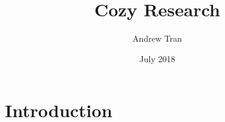 \documentclass[12pt]{article}
\title{Cozy Research}
\author{Andrew Tran}
\date{July 2018}
\begin{document}
\maketitle

\section*{Introduction}
\end{document}

